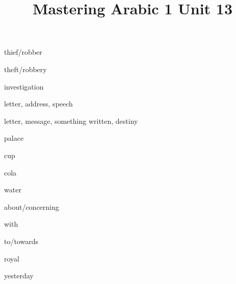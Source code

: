 \documentclass[avery5371,grid,frame]{flashcards}
\title{Mastering Arabic 1 Unit 13}
\begin{document}
\begin{flashcard}{\LARGE thief/robber}
\LARGE {}
\end{flashcard}
\begin{flashcard}{\LARGE theft/robbery}
\LARGE {}
\end{flashcard}
\begin{flashcard}{\LARGE investigation}
\LARGE {}
\end{flashcard}
\begin{flashcard}{\LARGE letter, address, speech}
\LARGE {}
\end{flashcard}
\begin{flashcard}{\LARGE letter, message, something written, destiny}
\LARGE {}
\end{flashcard}
\begin{flashcard}{\LARGE palace}
\LARGE {}
\end{flashcard}
\begin{flashcard}{\LARGE cup}
\LARGE {}
\end{flashcard}
\begin{flashcard}{\LARGE cola}
\LARGE {}
\end{flashcard}
\begin{flashcard}{\LARGE water}
\LARGE {}
\end{flashcard}
\begin{flashcard}{\LARGE about/concerning}
\LARGE {}
\end{flashcard}
\begin{flashcard}{\LARGE with}
\LARGE {}
\end{flashcard}
\begin{flashcard}{\LARGE to/towards}
\LARGE {}
\end{flashcard}
\begin{flashcard}{\LARGE royal}
\LARGE {}
\end{flashcard}
\begin{flashcard}{\LARGE yesterday}
\LARGE {}
\end{flashcard}
\end{document}
